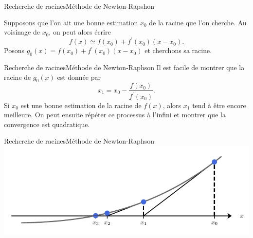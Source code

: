 \documentclass[usenames,dvipsnames,svgnames,10pt,aspectratio=169]{beamer}
\begin{document}
\begin{frame}[t, c]{Recherche de racines}{Méthode de Newton-Rapshon}
  \begin{minipage}{.68\textwidth}
    Supposons que l'on ait une bonne estimation $x_0$ de la racine que l'on cherche.
    Au voisinage de $x_0$, on peut alors écrire
    \[
    f(x) \simeq f(x_0) + f^{\prime}(x_0) \left(x - x_0 \right).
    \]
    Posons $g_0(x) = f(x_0) + f^{\prime}(x_0) \left( x - x_0 \right)$ et cherchons sa racine.
  \end{minipage}%
  \hfill
  \begin{minipage}{.28\textwidth}
    \centering
  \end{minipage}

  \vspace{1cm}
\end{frame}

\begin{frame}[t, c]{Recherche de racines}{Méthode de Newton-Raphson}
  Il est facile de montrer que la racine de $g_0(x)$ est donnée par
  \[
  x_1 = x_0 - \dfrac{f(x_0)}{f^{\prime}(x_0)}.
  \]
  Si $x_0$ est une bonne estimation de la racine de $f(x)$, alors $x_1$ tend à être encore meilleure.
  On peut ensuite répéter ce processus à l'infini et montrer que la convergence est quadratique.
\end{frame}

\begin{frame}[t, c]{Recherche de racines}{Méthode de Newton-Raphson}
  \centering
  \includegraphics[width=.8\textwidth]{Newton_method}
\end{frame}
\end{document}

